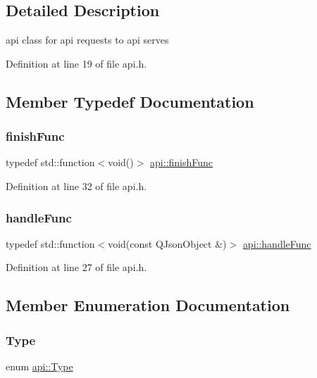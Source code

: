 \subsection{Detailed Description}
api class for api requests to api serves 

Definition at line 19 of file api.\+h.



\subsection{Member Typedef Documentation}
\mbox{\label{classapi_ac68be0fe2ba36f25c4f776b1eeff0482}} 
\subsubsection{\texorpdfstring{finish\+Func}{finishFunc}}
{\footnotesize\ttfamily typedef std\+::function$<$void()$>$ \hyperlink{classapi_ac68be0fe2ba36f25c4f776b1eeff0482}{api\+::finish\+Func}}



Definition at line 32 of file api.\+h.

\mbox{\label{classapi_ae177be144c99e5b642bc435ff14f91eb}} 
\subsubsection{\texorpdfstring{handle\+Func}{handleFunc}}
{\footnotesize\ttfamily typedef std\+::function$<$void(const Q\+Json\+Object \&)$>$ \hyperlink{classapi_ae177be144c99e5b642bc435ff14f91eb}{api\+::handle\+Func}}



Definition at line 27 of file api.\+h.



\subsection{Member Enumeration Documentation}
\mbox{\label{classapi_a4d626d9c11b80e532928299e68ff5bd9}} 
\subsubsection{\texorpdfstring{Type}{Type}}
{\footnotesize\ttfamily enum \hyperlink{classapi_a4d626d9c11b80e532928299e68ff5bd9}{api\+::\+Type}\hspace{0.3cm}{\ttfamily [strong]}}

